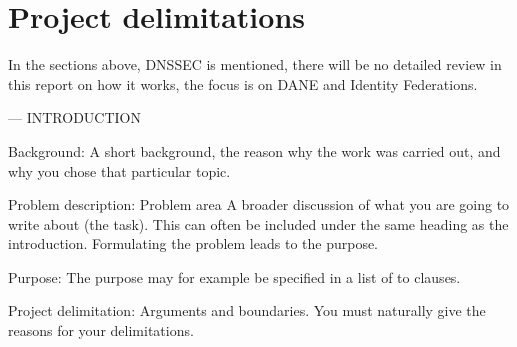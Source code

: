\section{Project delimitations}
In the sections above, DNSSEC is mentioned, there will be no detailed review in this report on how it works, the focus is on DANE and Identity Federations. 

---
INTRODUCTION 

Background: A short background, the reason why the work was carried out, and why you chose that particular topic.

Problem description: Problem area A broader discussion of what you are going to write about (the task). This can often be included under the same heading as the introduction. Formulating the problem leads to the purpose.

Purpose: The purpose may for example be specified in a list of to clauses.

Project delimitation: Arguments and boundaries. You must naturally give the reasons for your delimitations.
